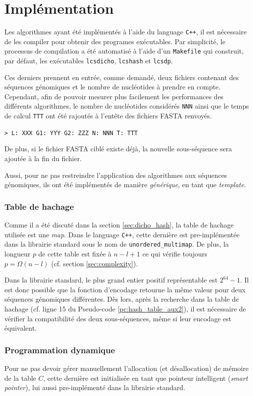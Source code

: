 \documentclass[a4paper, 12pt]{article}
\begin{document}
	\section{Implémentation}
	Les algorithmes ayant été implémentés à l'aide du language \texttt{C++}, il est nécessaire de les compiler pour obtenir des programes exécutables. Par simplicité, le processus de compilation a été automatisé à l'aide d'un \texttt{Makefile} qui construit, par défaut, les exécutables \texttt{lcsdicho}, \texttt{lcshash} et \texttt{lcsdp}. \par
	Ces derniers prennent en entrée, comme demandé, deux fichiers contenant des séquences génomiques et le nombre de nucléotides à prendre en compte. Cependant, afin de pouvoir mesurer plus facilement les performances des différents algorithmes, le nombre de nucléotides considérés \texttt{NNN} ainsi que le temps de calcul \texttt{TTT} ont été rajoutés à l'entête des fichiers FASTA renvoyés.
	\begin{center}
		\texttt{> L: XXX G1: YYY G2: ZZZ N: NNN T: TTT}
	\end{center}
	De plus, si le fichier FASTA ciblé existe déjà, la nouvelle sous-séquence sera ajoutée à la fin du fichier. \par
	Aussi, pour ne pas restreindre l'application des algorithmes aux séquences génomiques, ils ont été implémentés de manière \emph{générique}, \cad{} en tant que \emph{template}.
	\subsubsection*{Table de hachage}
	Comme il a été discuté dans la section \ref{sec:dicho_hash}, la table de hachage utilisée est une \emph{map}. Dans le language \texttt{C++}, cette dernière est pre-implémentée dans la librairie standard sous le nom de \texttt{unordered\_multimap}. De plus, la longueur $p$ de cette table est fixée à $n - l + 1$ ce qui vérifie toujours $p = \Omega(n - l)$ (cf. section \ref{sec:complexity}). \par
	Dans la librairie standard, le plus grand entier positif représentable est $2^{64} - 1$. Il est donc possible que la fonction d'encodage retourne la même valeur pour deux séquences génomiques différentes. Dès lors, après la recherche dans la table de hachage (cf. ligne 15 du Pseudo-code \ref{pc:hash_table_aux2}), il est nécessaire de vérifier la compatibilité des deux sous-séquences, même si leur encodage est équivalent.
	\subsubsection*{Programmation dynamique}
	Pour ne pas devoir gérer manuellement l'allocation (et désallocation) de mémoire de la table $C$, cette dernière est initialisée en tant que pointeur intelligent (\emph{smart pointer}), lui aussi pre-implémenté dans la librairie standard.
	\newpage
\end{document}
